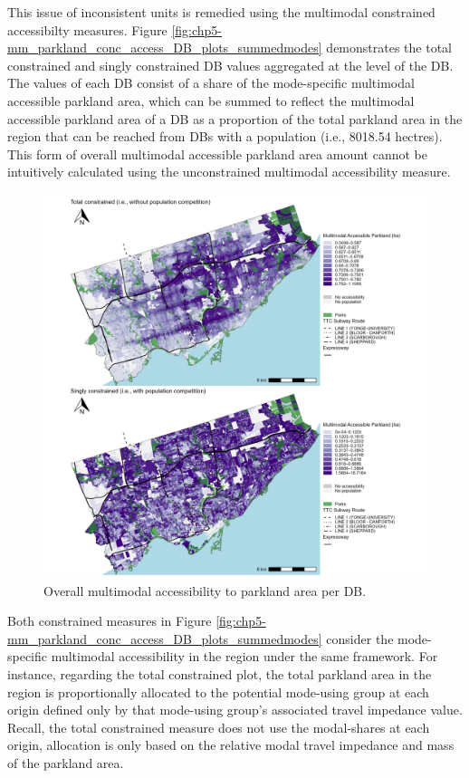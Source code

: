 \documentclass[
11pt, %
oneside, %
english, %
singlespacing, %
]{macthesis} %
\begin{document}
This issue of inconsistent units is remedied using the multimodal constrained accessibilty measures. Figure \ref{fig:chp5-mm_parkland_conc_access_DB_plots_summedmodes} demonstrates the total constrained and singly constrained DB values aggregated at the level of the DB. The values of each DB consist of a share of the mode-specific multimodal accessible parkland area, which can be summed to reflect the multimodal accessible parkland area of a DB as a proportion of the total parkland area in the region that can be reached from DBs with a population (i.e., 8018.54 hectres). This form of overall multimodal accessible parkland area amount cannot be intuitively calculated using the unconstrained multimodal accessibility measure.

\begin{figure}

{\centering \includegraphics[width=6in]{./data/figures/chp5-mm_parkland_conc_access_DB_plots_summedmodes} 

}

\caption{\label{fig:chp5-mm_parkland_conc_access_DB_plots_summedmodes}Overall multimodal accessibility to parkland area per DB.}\label{fig:unnamed-chunk-75}
\end{figure}

Both constrained measures in Figure \ref{fig:chp5-mm_parkland_conc_access_DB_plots_summedmodes} consider the mode-specific multimodal accessibility in the region under the same framework. For instance, regarding the total constrained plot, the total parkland area in the region is proportionally allocated to the potential mode-using group at each origin defined only by that mode-using group's associated travel impedance value. Recall, the total constrained measure does not use the modal-shares at each origin, allocation is only based on the relative modal travel impedance and mass of the parkland area.
\end{document}
